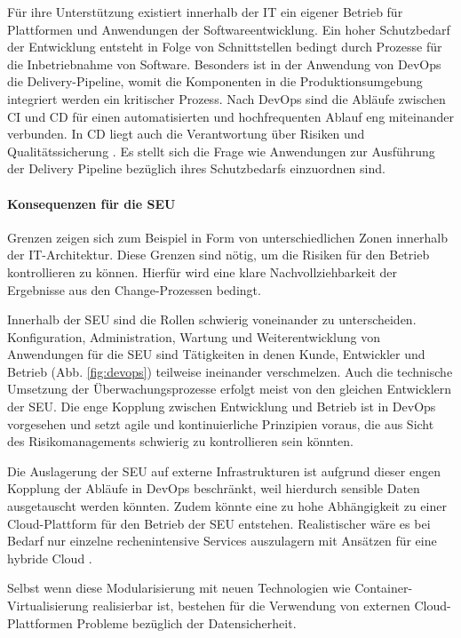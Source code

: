 Für ihre Unterstützung existiert innerhalb der IT ein eigener Betrieb für Plattformen und Anwendungen der Softwareentwicklung. Ein hoher Schutzbedarf der Entwicklung entsteht in Folge von Schnittstellen bedingt durch Prozesse für die Inbetriebnahme von Software. Besonders ist in der Anwendung von DevOps die Delivery-Pipeline, womit die Komponenten in die Produktionsumgebung integriert werden ein kritischer Prozess. Nach DevOps sind die Abläufe zwischen \ac{CI} und \ac{CD} für einen automatisierten und hochfrequenten Ablauf eng miteinander verbunden. In \ac{CD} liegt auch die Verantwortung über Risiken und Qualitätssicherung \cite{Alt2017}.
Es stellt sich die Frage wie Anwendungen zur Ausführung der Delivery Pipeline bezüglich ihres Schutzbedarfs einzuordnen sind. 

\paragraph{Konsequenzen für die SEU}
Grenzen zeigen sich zum Beispiel in Form von unterschiedlichen Zonen innerhalb der IT-Architektur. 
Diese Grenzen sind nötig, um die Risiken für den Betrieb kontrollieren zu können. Hierfür wird eine klare Nachvollziehbarkeit der Ergebnisse aus den Change-Prozessen bedingt.

Innerhalb der \ac{SEU} sind die Rollen schwierig voneinander zu unterscheiden. Konfiguration, Administration, Wartung und Weiterentwicklung von Anwendungen für die \ac{SEU} sind Tätigkeiten in denen Kunde, Entwickler und Betrieb (Abb. \ref{fig:devops}) teilweise ineinander verschmelzen. Auch die technische Umsetzung der Überwachungsprozesse erfolgt meist von den gleichen Entwicklern der \ac{SEU}. 
Die enge Kopplung zwischen Entwicklung und Betrieb ist in DevOps vorgesehen \cite{} und setzt agile und kontinuierliche Prinzipien voraus, die aus Sicht des Risikomanagements schwierig zu kontrollieren sein könnten. 

Die Auslagerung der \ac{SEU} auf externe Infrastrukturen ist aufgrund dieser engen Kopplung der Abläufe in DevOps beschränkt, weil hierdurch sensible Daten ausgetauscht werden könnten. Zudem könnte eine zu hohe Abhängigkeit zu einer Cloud-Plattform für den Betrieb der \ac{SEU} entstehen. Realistischer wäre es bei Bedarf nur einzelne rechenintensive Services auszulagern mit Ansätzen für eine hybride Cloud \cite{Gupta:2017}. 

Selbst wenn diese Modularisierung mit neuen Technologien wie Container-Virtualisierung realisierbar ist, bestehen für die Verwendung von externen Cloud-Plattformen Probleme bezüglich der Datensicherheit. 


